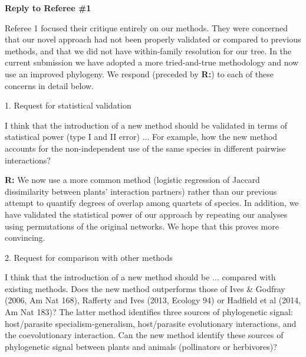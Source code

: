 \documentclass[12pt]{letter}
\newenvironment{refquote}{\bigskip \begin{it}}{\end{it}\smallskip}
\begin{document}
\newpage

\setcounter{page}{1}


{\Large \bf Reply to Referee \#1}


  Referee 1 focused their critique entirely on our methods. They were concerned that our novel approach had not been properly validated or compared to previous methods, and that we did not have within-family resolution for our tree. In the current submission we have adopted a more tried-and-true methodology and now use an improved phylogeny. We respond (preceded by \textbf{R:}) to each of these concerns in detail below.

  1. Request for statistical validation

    \begin{refquote}  

      I think that the introduction of a new method should be validated in terms of statistical power (type I and II error) ... For example, how the new method accounts for the non-independent use of the same species in different pairwise interactions?

    \end{refquote}

    \textbf{R:} We now use a more common method (logistic regression of Jaccard dissimilarity between plants' interaction partners) rather than our previous attempt to quantify degrees of overlap among quartets of species. In addition, we have validated the statistical power of our approach by repeating our analyses using permutations of the original networks. We hope that this proves more convincing.


  2. Request for comparison with other methods

    \begin{refquote}

      I think that the introduction of a new method should be ... compared with existing methods.  Does the new method outperforms  those of Ives \& Godfray (2006, Am Nat 168),  Rafferty and Ives (2013, Ecology 94) or Hadfield et al (2014, Am Nat 183)? The latter method identifies three sources of phylogenetic signal: host/parasite specialism-generalism, host/parasite evolutionary interactions, and the coevolutionary interaction. Can the new method identify these sources of phylogenetic signal between plants and animals (pollinators or herbivores)?

    \end{refquote}
\end{document}
